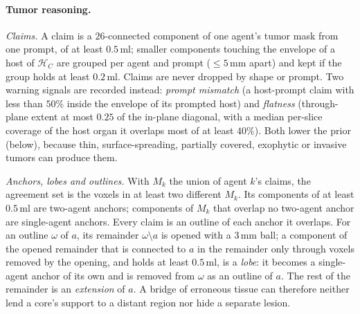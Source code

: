 \documentclass[fleqn,10pt]{olplainarticle}
\begin{document}
\paragraph{Tumor reasoning.}
\label{sec:tumor_details}
\emph{Claims.} A claim is a $26$-connected component of one agent's tumor mask from one prompt, of at least $0.5$\,ml;
smaller components touching the envelope of a host of $\mathcal{H}_C$ are grouped per agent and prompt ($\le5$\,mm apart)
and kept if the group holds at least $0.2$\,ml. Claims are never dropped by shape or prompt. Two warning signals are
recorded instead: \emph{prompt mismatch} (a host-prompt claim with less than $50\%$ inside the envelope of its prompted
host) and \emph{flatness} (through-plane extent at most $0.25$ of the in-plane diagonal, with a median per-slice coverage of
the host organ it overlaps most of at least $40\%$). Both lower the prior (below), because thin, surface-spreading,
partially covered, exophytic or invasive tumors can produce them.

\emph{Anchors, lobes and outlines.} With $M_k$ the union of agent $k$'s claims, the agreement set is the voxels in at least
two different $M_k$. Its components of at least $0.5$\,ml are two-agent anchors; components of $M_k$ that overlap no
two-agent anchor are single-agent anchors. Every claim is an outline of each anchor it overlaps. For an outline $\omega$ of
$a$, its remainder $\omega\setminus a$ is opened with a $3$\,mm ball; a component of the opened remainder that is
connected to $a$ in the remainder only through voxels removed by the opening, and holds at least $0.5$\,ml, is a
\emph{lobe}: it becomes a single-agent anchor of its own and is removed from $\omega$ as an outline of $a$. The rest of the
remainder is an \emph{extension} of $a$. A bridge of erroneous tissue can therefore neither lend a core's support to a
distant region nor hide a separate lesion.
\end{document}
